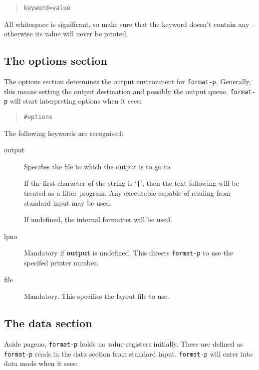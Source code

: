 \documentclass[a4paper,twoside]{article}
\begin{document}
	\begin{quote}
		\texttt{keyword=value}
	\end{quote}

All whitespace is significant, so make sure that the keyword doesn't
contain any -- otherwise its value will never be printed.

\subsection{The options section}

	The options section determines the output environment for
	\texttt{format-p}.
	Generally, this means setting the output destination and possibly
	the output queue.
	\texttt{format-p} will start interpreting options when it
	sees:

		\begin{quote}
			\texttt{\#options}
		\end{quote}

	The following keywords are recognised:

		\begin{description}
			\item[output]
				Specifies the file to which the output is to go to.

				If the first character of the string is `\texttt{|}', then
				the text following will be treated as a filter program.
				Any executable
				capable of reading from standard input may be used.

				If undefined, the internal formatter will be used.

			\item[lpno]
				Mandatory if \textbf{output} is undefined. This directs
				\texttt{format-p} to use the specifed printer number.

			\item[file]
				Mandatory. This specifies the layout file to use.

		\end{description}

\subsection{The data section}

	Aside \textsf{pageno}, \texttt{format-p} holds no value-registers
	initially.
	These are defined as \texttt{format-p} reads in
	the data section from standard
	input. \texttt{format-p} will enter into data mode when it sees:
\end{document}
